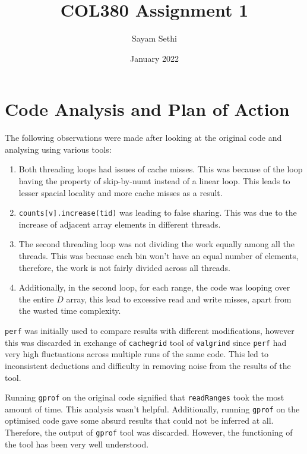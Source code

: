 \documentclass[11pt]{article}
\title{COL380 Assignment 1}
\author{Sayam Sethi}
\date{January 2022}
\begin{document}
\maketitle

\tableofcontents

\section{Code Analysis and Plan of Action}
The following observations were made after looking at the original code and analysing using various tools:
\begin{enumerate}
	\item Both threading loops had issues of cache misses. This was because of the loop having the property of skip-by-numt instead of a linear loop. This leads to lesser spacial locality and more cache misses as a result.
	\item \texttt{counts[v].increase(tid)} was leading to false sharing. This was due to the increase of adjacent array elements in different threads.
	\item The second threading loop was not dividing the work equally among all the threads. This was becuase each bin won't have an equal number of elements, therefore, the work is not fairly divided across all threads.
	\item Additionally, in the second loop, for each range, the code was looping over the entire $D$ array, this lead to excessive read and write misses, apart from the wasted time complexity.
\end{enumerate}
\texttt{perf} was initially used to compare results with different modifications, however this was discarded in exchange of \texttt{cachegrid} tool of \texttt{valgrind} since \texttt{perf} had very high fluctuations across multiple runs of the same code. This led to inconsistent deductions and difficulty in removing noise from the results of the tool.\par
Running \texttt{gprof} on the original code signified that \texttt{readRanges} took the most amount of time. This analysis wasn't helpful. Additionally, running \texttt{gprof} on the optimised code gave some absurd results that could not be inferred at all. Therefore, the output of \texttt{gprof} tool was discarded. However, the functioning of the tool has been very well understood.\par
\end{document}
